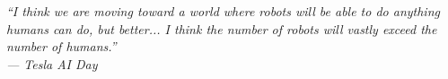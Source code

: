 \cleardoublepage
\thispagestyle{empty}
\begin{flushright}
\itshape ``I think we are moving toward a world where robots will be able to do anything humans can do, but better... I think the number of robots will vastly exceed the number of humans.''\\ \vspace{5mm}
--- Tesla AI Day
\end{flushright}
\cleardoublepage